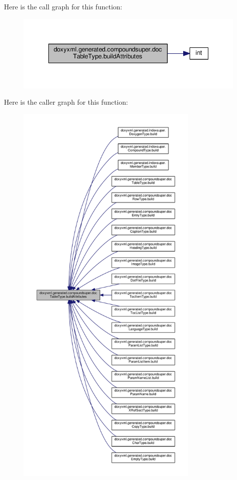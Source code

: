 Here is the call graph for this function\+:
\nopagebreak
\begin{figure}[H]
\begin{center}
\leavevmode
\includegraphics[width=335pt]{d9/d0e/classdoxyxml_1_1generated_1_1compoundsuper_1_1docTableType_a2bd182e39ecb797796e3053ba2cb34a6_cgraph}
\end{center}
\end{figure}




Here is the caller graph for this function\+:
\nopagebreak
\begin{figure}[H]
\begin{center}
\leavevmode
\includegraphics[height=550pt]{d9/d0e/classdoxyxml_1_1generated_1_1compoundsuper_1_1docTableType_a2bd182e39ecb797796e3053ba2cb34a6_icgraph}
\end{center}
\end{figure}


